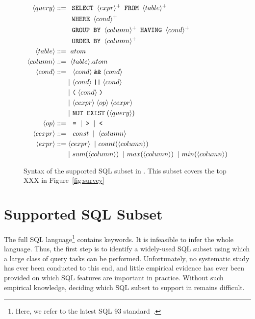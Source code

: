 \begin{figure}[t]
\footnotesize%
\begin{align*}
\langle query\rangle ::= {} 
	& \texttt{ SELECT } \langle expr\rangle^+ \texttt{ FROM } \langle table\rangle^+ \\
        & \texttt{ WHERE } \langle cond\rangle^+ \\ 
	&  \texttt{ GROUP BY } \langle column\rangle^+ \texttt{ HAVING } \langle cond\rangle^+\\
	&  \texttt{ ORDER BY } \langle column\rangle^+ \\
\langle table\rangle::= {} &\ atom \\
\langle column\rangle ::= {} &\ \langle table\rangle.atom\\
\langle cond\rangle ::= {} &\ \ \langle cond\rangle \;\texttt{\&\&}\; \langle cond\rangle \\ 
    & |\ \langle cond\rangle \;\texttt{||}\; \langle cond\rangle \\
    & |\ \texttt{(}\;\langle cond\rangle\;\texttt{)} \\
    & |\ \langle cexpr\rangle \;\langle op\rangle\; \langle cexpr\rangle \\
    & |\ \texttt{NOT EXIST} \;(\langle query\rangle) \\
\langle op\rangle ::= {} &\ \ \texttt{=} \;\;|\;\; \texttt{>}  \;\;|\;\; \texttt{<}\\
\langle cexpr\rangle ::= {} &\ \ const \;\;|\;\; \langle column\rangle  \;\; \\
\langle expr\rangle ::= {} & \langle cexpr\rangle \;\;|\ count(\langle column\rangle) \\
    & |\ sum(\langle column\rangle) \;\;|\ max(\langle column\rangle) \;\;|\ min(\langle column\rangle) 
\end{align*}
\normalsize%
\caption{Syntax of the supported SQL subset in \ourtool.
This subset covers the top XXX 
in Figure~\ref{fig:survey}}
\label{fig:syntax}
\end{figure}


\section{Supported SQL Subset}
\label{sec:langsubset}


The full SQL language\footnote{Here, we refer to
the latest SQL 93 standard~\cite{}.} contains
 keywords. It is infeasible to infer
the whole language. Thus, the
first step is to identify a widely-used SQL
subset using which a large class of query tasks
can be performed. Unfortunately, no systematic
study has ever been conducted to this end,
and little empirical evidence has ever been provided
on which SQL features are important in practice.
Without such empirical knowledge, deciding which
SQL subset to support in \ourtool remains difficult.


